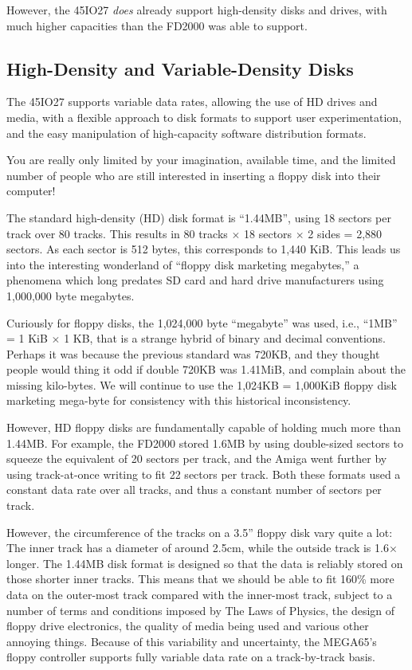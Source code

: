 However, the 45IO27 {\em does} already support high-density disks and drives, with much
higher capacities than the FD2000 was able to support.

\subsection{High-Density and Variable-Density Disks}

The 45IO27 supports variable data rates, allowing the use of HD drives and media,
with a flexible approach to disk formats to support user experimentation, and the
easy manipulation of high-capacity software distribution formats.

You are really only limited by your imagination, available time, and
the limited number of people who are still interested in inserting a
floppy disk into their computer!

The standard high-density (HD) disk format is ``1.44MB'', using 18 sectors per track over 80 tracks.
This results in 80 tracks $\times$ 18 sectors $\times$ 2 sides = 2,880 sectors. As each sector
is 512 bytes, this corresponds to 1,440 KiB.  This leads us into the interesting wonderland of
``floppy disk marketing megabytes,'' a phenomena which long predates SD card and hard drive
manufacturers using 1,000,000 byte megabytes.

Curiously for floppy disks, the 1,024,000 byte ``megabyte'' was used, i.e., ``1MB'' = 1 KiB $\times$ 1 KB,
that is a strange hybrid of binary and decimal conventions.  Perhaps it was because the previous standard
was 720KB, and they thought people would thing it odd if double 720KB was 1.41MiB, and complain about the
missing kilo-bytes.  We will continue to use the 1,024KB = 1,000KiB floppy disk marketing mega-byte for
consistency with this historical inconsistency.

However, HD floppy disks are fundamentally capable of holding much more than 1.44MB. For example, the FD2000
stored 1.6MB by using double-sized sectors to squeeze the equivalent of 20 sectors per track, and the Amiga
went further by using track-at-once writing to fit 22 sectors per track. Both these formats used a constant
data rate over all tracks, and thus a constant number of sectors per track.

However, the circumference of the tracks on a 3.5'' floppy disk vary quite a lot: The inner track has a diameter
of around 2.5cm, while the outside track is 1.6$\times$ longer. 
The 1.44MB disk format is designed so that
the data is reliably stored on those shorter inner tracks.
This means that we should be able to fit 160\%
more data on the outer-most track compared with the inner-most track, subject to a number of terms and conditions
imposed by The Laws of Physics, the design of floppy drive electronics, the quality of media being used and
various other annoying things.
Because of this variability and uncertainty, the MEGA65's floppy controller supports fully variable data rate
on a track-by-track basis.


